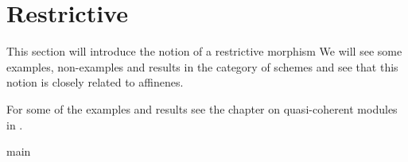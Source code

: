 \chapter{Restrictive}
This section will introduce the notion of a restrictive morphism
We will see some examples, non-examples and results in the category of schemes
and see that this notion is closely related to affinenes.

For some of the examples and results see the chapter on quasi-coherent modules in \cite{vakil}.

{main}
